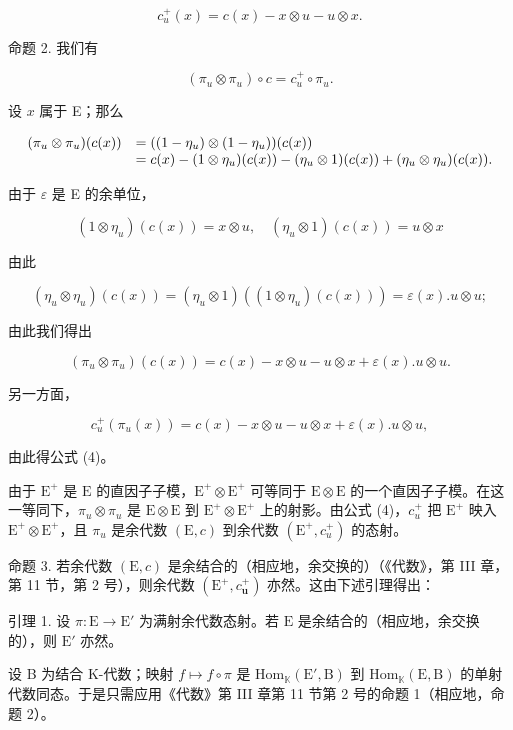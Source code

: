 \[
c _ {u} ^ {+} (x) = c (x) - x \otimes u - u \otimes x.\tag{3}
\]

命题 2. 我们有

\[
\left(\pi_ {u} \otimes \pi_ {u}\right) \circ c = c _ {u} ^ {+} \circ \pi_ {u}.\tag{4}
\]

设 \(x\) 属于 E；那么

\[
\begin{array}{r l} (\pi_ {u} \otimes \pi_ {u}) (c (x)) & = ((1 - \eta_ {u}) \otimes (1 - \eta_ {u})) (c (x)) \\ & = c (x) - (1 \otimes \eta_ {u}) (c (x)) - (\eta_ {u} \otimes 1) (c (x)) + (\eta_ {u} \otimes \eta_ {u}) (c (x)). \end{array}
\]

由于 \(\varepsilon\) 是 E 的余单位，

\[
(1 \otimes \eta_ {u}) (c (x)) = x \otimes u, \quad (\eta_ {u} \otimes 1) (c (x)) = u \otimes x
\]

由此

\[
\left(\eta_ {u} \otimes \eta_ {u}\right) (c (x)) = \left(\eta_ {u} \otimes 1\right) \left(\left(1 \otimes \eta_ {u}\right) (c (x))\right) = \varepsilon (x). u \otimes u;
\]

由此我们得出

\[
\left(\pi_ {u} \otimes \pi_ {u}\right) (c (x)) = c (x) - x \otimes u - u \otimes x + \varepsilon (x). u \otimes u.
\]

另一方面，

\[
c _ {u} ^ {+} \left(\pi_ {u} (x)\right) = c (x) - x \otimes u - u \otimes x + \varepsilon (x). u \otimes u,
\]

由此得公式 (4)。

由于 \(\mathrm{E}^{+}\) 是 \(\mathrm{E}\) 的直因子子模，\(\mathrm{E}^{+} \otimes \mathrm{E}^{+}\) 可等同于 \(\mathrm{E} \otimes \mathrm{E}\) 的一个直因子子模。在这一等同下，\(\pi_{u} \otimes \pi_{u}\) 是 \(\mathrm{E} \otimes \mathrm{E}\) 到 \(\mathrm{E}^{+} \otimes \mathrm{E}^{+}\) 上的射影。由公式 (4)，\(c_{u}^{+}\) 把 \(\mathrm{E}^{+}\) 映入 \(\mathrm{E}^{+} \otimes \mathrm{E}^{+}\)，且 \(\pi_{u}\) 是余代数 \((\mathrm{E}, c)\) 到余代数 \((\mathrm{E}^{+}, c_{u}^{+})\) 的态射。

命题 3. 若余代数 \((\mathrm{E}, c)\) 是余结合的（相应地，余交换的）（《代数》，第 III 章，第 11 节，第 2 号），则余代数 \((\mathrm{E}^{+}, c_{\mathbf{u}}^{+})\) 亦然。这由下述引理得出：

引理 1. 设 \(\pi: \mathrm{E} \to \mathrm{E}'\) 为满射余代数态射。若 \(\mathrm{E}\) 是余结合的（相应地，余交换的），则 \(\mathrm{E}'\) 亦然。

设 B 为结合 K-代数；映射 \(f \mapsto f \circ \pi\) 是 \(\mathrm{Hom}_{\mathbb{K}}(\mathrm{E}', \mathrm{B})\) 到 \(\mathrm{Hom}_{\mathbb{K}}(\mathrm{E}, \mathrm{B})\) 的单射代数同态。于是只需应用《代数》第 III 章第 11 节第 2 号的命题 1（相应地，命题 2）。

